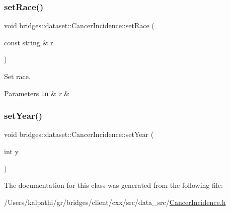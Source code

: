 \subsubsection{\texorpdfstring{set\+Race()}{setRace()}}
{\footnotesize\ttfamily void bridges\+::dataset\+::\+Cancer\+Incidence\+::set\+Race (\begin{DoxyParamCaption}\item[{const string \&}]{r }\end{DoxyParamCaption})\hspace{0.3cm}{\ttfamily [inline]}}



Set race. 


\begin{DoxyParams}[1]{Parameters}
\mbox{\tt in}  & {\em r} & \\
\hline
\end{DoxyParams}
\mbox{\label{classbridges_1_1dataset_1_1_cancer_incidence_a833ce8f785d61a5271a2ef949ed76680}} 
\subsubsection{\texorpdfstring{set\+Year()}{setYear()}}
{\footnotesize\ttfamily void bridges\+::dataset\+::\+Cancer\+Incidence\+::set\+Year (\begin{DoxyParamCaption}\item[{int}]{y }\end{DoxyParamCaption})\hspace{0.3cm}{\ttfamily [inline]}}



The documentation for this class was generated from the following file\+:\begin{DoxyCompactItemize}
\item 
/\+Users/kalpathi/gr/bridges/client/cxx/src/data\+\_\+src/\mbox{\hyperlink{_cancer_incidence_8h}{Cancer\+Incidence.\+h}}\end{DoxyCompactItemize}
